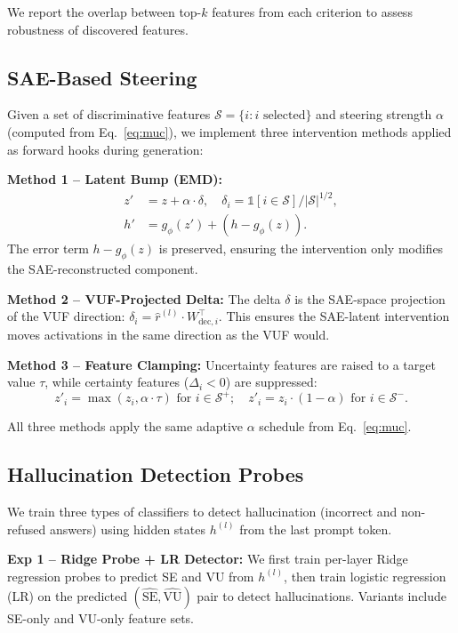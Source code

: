 \documentclass{article}
\newcommand{\VU}{\mathrm{VU}}
\newcommand{\SE}{\mathrm{SE}}
\begin{document}
We report the overlap between top-$k$ features from each criterion to assess
robustness of discovered features.

\subsection{SAE-Based Steering}

Given a set of discriminative features $\mathcal{S} = \{i : i \text{ selected}\}$
and steering strength $\alpha$ (computed from Eq.~\ref{eq:muc}), we implement
three intervention methods applied as forward hooks during generation:

\textbf{Method 1 -- Latent Bump (EMD):}
\begin{align}
  z' &= z + \alpha \cdot \delta, \quad \delta_i = \mathbb{1}[i \in \mathcal{S}] / |\mathcal{S}|^{1/2}, \\
  h' &= g_\phi(z') + (h - g_\phi(z)).
  \label{eq:emd}
\end{align}
The error term $h - g_\phi(z)$ is preserved, ensuring the intervention only
modifies the SAE-reconstructed component.

\textbf{Method 2 -- VUF-Projected Delta:}
The delta $\delta$ is the SAE-space projection of the VUF direction:
$\delta_i = \hat{r}^{(l)} \cdot W_{\mathrm{dec},i}^{\top}$.
This ensures the SAE-latent intervention moves activations in the same direction
as the VUF would.

\textbf{Method 3 -- Feature Clamping:}
Uncertainty features are raised to a target value $\tau$, while certainty
features ($\Delta_i < 0$) are suppressed:
\begin{equation}
  z'_i = \max(z_i, \alpha \cdot \tau) \text{ for } i \in \mathcal{S}^+; \quad
  z'_i = z_i \cdot (1 - \alpha)   \text{ for } i \in \mathcal{S}^-.
\end{equation}

All three methods apply the same adaptive $\alpha$ schedule from Eq.~\ref{eq:muc}.

\subsection{Hallucination Detection Probes}
\label{sec:probes}

We train three types of classifiers to detect hallucination (incorrect and
non-refused answers) using hidden states $h^{(l)}$ from the last prompt token.

\textbf{Exp 1 -- Ridge Probe + LR Detector:}
We first train per-layer Ridge regression probes to predict SE and VU from
$h^{(l)}$, then train logistic regression (LR) on the predicted
$(\hat{\SE}, \hat{\VU})$ pair to detect hallucinations.  Variants include
SE-only and VU-only feature sets.
\end{document}
